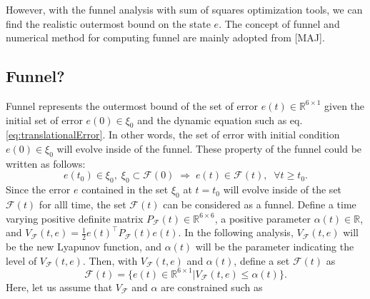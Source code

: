\documentclass[letterpaper, 10 pt, conference]{ieeeconf}  %
\begin{document}
However, with the funnel analysis with sum of squares optimization tools, we can find the realistic outermost bound on the state $e$.
The concept of funnel and numerical method for computing funnel are mainly adopted from [MAJ]. 
\subsection{Funnel?}
Funnel represents the outermost bound of the set of error $e(t)\in \mathbb{R}^{6\times 1}$ given the initial set of error $e(0) \in \xi_0$ and the dynamic equation such as eq.\eqref{eq:translationalError}.
In other words, the set of error with initial condition $e(0) \in \xi_0$ will evolve inside of the funnel.
These property of the funnel could be written as follows:
\begin{equation}
e(t_0) \in \xi_0,\;\xi_0 \subset \mathcal{F}(0)\;\Rightarrow\; e(t) \in \mathcal{F}(t),\;\;\forall t \geq t_0. \label{eq:funnel1}
\end{equation}
Since the error $e$ contained in the set $\xi_0$ at $t = t_0$ will evolve inside of the set $\mathcal{F}(t)$ for alll time, the set $\mathcal{F}(t)$ can be considered as a funnel.
Define a time varying positive definite matrix $P_\mathcal{F}(t) \in \mathbb{R}^{6\times 6}$, a positive parameter $\alpha(t) \in \mathbb{R}$, and $V_\mathcal{F}(t,e) = \frac{1}{2}e(t)^\intercal P_\mathcal{F}(t) e(t)$.
In the following analysis, $V_\mathcal{F}(t,e)$ will be the new Lyapunov function, and $\alpha(t)$ will be the parameter indicating the level of $V_\mathcal{F}(t,e)$.
Then, with $V_\mathcal{F}(t,e)$ and $\alpha(t)$, define a set $\mathcal{F}(t)$ as 
\begin{equation}
\mathcal{F}(t) = \{e(t) \in \mathbb{R}^{6\times 1} | V_\mathcal{F}(t,e) \leq \alpha(t)\}. \label{eq:funnel2}
\end{equation}
Here, let us assume that $V_\mathcal{F}$ and $\alpha$ are constrained such as
\end{document}
